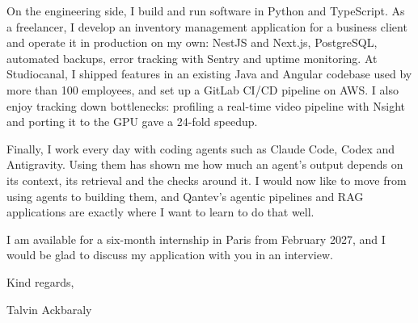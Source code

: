 \documentclass[11pt, a4paper]{extarticle}
\begin{document}
On the engineering side, I build and run software in Python and TypeScript. As a freelancer, I
develop an inventory management application for a business client and operate it in production on
my own: NestJS and Next.js, PostgreSQL, automated backups, error tracking with Sentry and uptime
monitoring. At Studiocanal, I shipped features in an existing Java and Angular codebase used by
more than 100 employees, and set up a GitLab CI/CD pipeline on AWS. I also enjoy tracking down
bottlenecks: profiling a real-time video pipeline with Nsight and porting it to the GPU gave a
24-fold speedup.

Finally, I work every day with coding agents such as Claude Code, Codex and Antigravity. Using
them has shown me how much an agent's output depends on its context, its retrieval and the checks
around it. I would now like to move from using agents to building them, and Qantev's agentic
pipelines and RAG applications are exactly where I want to learn to do that well.

I am available for a six-month internship in Paris from February 2027, and I would be glad to
discuss my application with you in an interview.

\vspace{4pt}
Kind regards,

\vspace{10pt}
\hfill Talvin Ackbaraly\hspace*{1cm}
\end{document}
